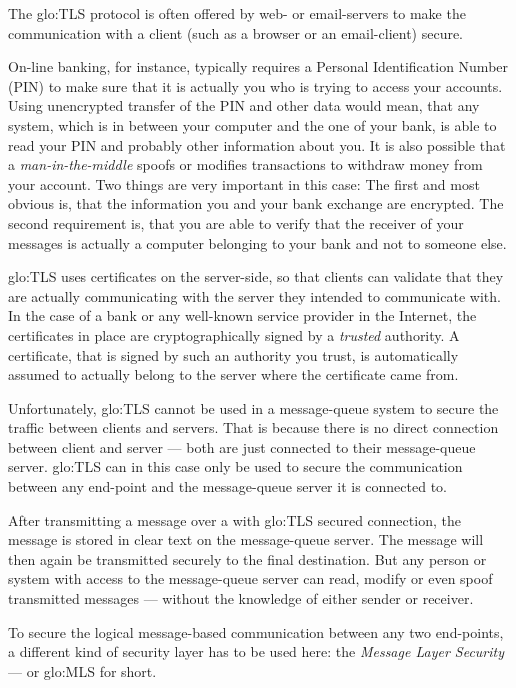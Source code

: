 The \gls{glo:TLS}  protocol is often  offered by web- or  email-servers to
make  the  communication   with  a  client  (such  as   a  browser  or  an
email-client) secure.

On-line   banking,   for   instance,   typically   requires   a   Personal
Identification Number  (PIN) to make sure  that it is actually  you who is
trying to access your accounts.  Using unencrypted transfer of the PIN and
other data would mean, that any  system, which is in between your computer
and the  one of your  bank, is  able to read  your PIN and  probably other
information about you. It is also possible that a \emph{man-in-the-middle}
spoofs or modifies  transactions to withdraw money from  your account. Two
things are  very important in  this case: The  first and most  obvious is,
that the information you and  your bank exchange are encrypted. The second
requirement is,  that you  are able  to verify that  the receiver  of your
messages is actually a computer belonging  to your bank and not to someone
else.

\gls{glo:TLS} uses  certificates on the  server-side, so that  clients can
validate  that  they  are  actually  communicating with  the  server  they
intended to  communicate with.  In  the case of  a bank or  any well-known
service  provider   in  the  Internet,  the  certificates   in  place  are
cryptographically  signed by a  \emph{trusted} authority.   A certificate,
that is signed by such an authority you trust, is automatically assumed to
actually belong to the server where the certificate came from.

Unfortunately, \gls{glo:TLS}  cannot be used in a  message-queue system to
secure the traffic  between clients and servers. That  is because there is
no direct connection between client and server --- both are just connected
to their message-queue server. \gls{glo:TLS} can in this case only be used
to secure  the communication between  any end-point and  the message-queue
server it  is connected to.

After transmitting a message over a with \gls{glo:TLS} secured connection,
the  message is  stored in  clear text  on the  message-queue  server. The
message   will  then   again  be   transmitted  securely   to   the  final
destination. But  any person  or system with  access to  the message-queue
server can read, modify or even spoof transmitted messages --- without the
knowledge of either sender or receiver.

To  secure  the  logical   message-based  communication  between  any  two
end-points, a  different kind of security  layer has to be  used here: the
\emph{Message Layer Security} --- or \gls{glo:MLS} for short.

